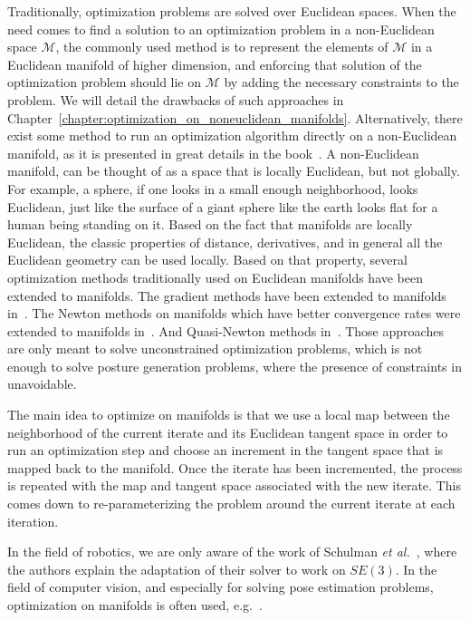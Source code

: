 Traditionally, optimization problems are solved over Euclidean spaces.
When the need comes to find a solution to an optimization problem in a non-Euclidean space $\mathcal{M}$, the commonly used method is to represent the elements of $\mathcal{M}$ in a Euclidean manifold of higher dimension, and enforcing that solution of the optimization problem should lie on $\mathcal{M}$ by adding the necessary constraints to the problem.
We will detail the drawbacks of such approaches in Chapter~\ref{chapter:optimization_on_noneuclidean_manifolds}.
Alternatively, there exist some method to run an optimization algorithm directly on a non-Euclidean manifold, as it is presented in great details in the book~\cite{absil:book:2008}.
A non-Euclidean manifold, can be thought of as a space that is locally Euclidean, but not globally.
For example, a sphere, if one looks in a small enough neighborhood, looks Euclidean, just like the surface of a giant sphere like the earth looks flat for a human being standing on it.
Based on the fact that manifolds are locally Euclidean, the classic properties of distance, derivatives, and in general all the Euclidean geometry can be used locally.
Based on that property, several optimization methods traditionally used on Euclidean manifolds have been extended to manifolds.
The gradient methods have been extended to manifolds in~\cite{luenberger1972gradient, gabay1982minimizing}.
The Newton methods on manifolds which have better convergence rates were extended to manifolds in~\cite{gabay1982minimizing, stuart1998dynamical, smith2013geometric}.
And Quasi-Newton methods in~\cite{gabay1982minimizing}.
Those approaches are only meant to solve unconstrained optimization problems, which is not enough to solve posture generation problems, where the presence of constraints in unavoidable.

The main idea to optimize on manifolds is that we use a local map between the neighborhood of the current iterate and its Euclidean tangent space in order to run an optimization step and choose an increment in the tangent space that is mapped back to the manifold.
Once the iterate has been incremented, the process is repeated with the map and tangent space associated with the new iterate.
This comes down to re-parameterizing the problem around the current iterate at each iteration.

In the field of robotics, we are only aware of the work of Schulman \emph{et al.}~\cite{Schulman2014}, where the authors explain the adaptation of their solver to work on $SE(3)$.
In the field of computer vision, and especially for solving pose estimation problems, optimization on manifolds is often used, e.g.~\cite{hertzberg2011, lu2000fast}.

